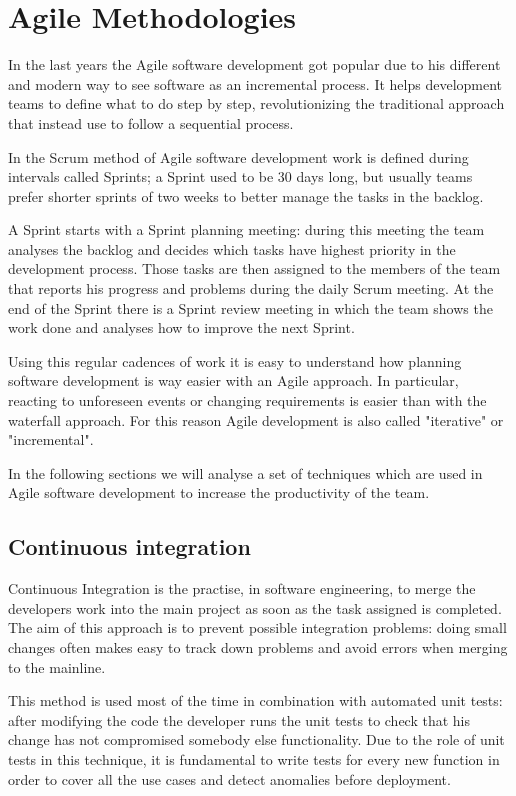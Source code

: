 \section{Agile Methodologies}

In the last years the Agile software development got popular due to his
different and modern way to see software as an incremental process. It
helps development teams to define what to do step by step, revolutionizing
the traditional approach that instead use to follow a sequential process.

In the Scrum method of Agile software development work is defined during
intervals called Sprints; a Sprint used to be 30 days long, but usually
teams prefer shorter sprints of two weeks to better manage the tasks in
the backlog.

A Sprint starts with a Sprint planning meeting: during this meeting the team
analyses the backlog and decides which tasks have highest priority in the
development process. Those tasks are then assigned to the members of the team
that reports his progress and problems during the daily Scrum meeting. At the
end of the Sprint there is a Sprint review meeting in which the team shows the
work done and analyses how to improve the next Sprint.

Using this regular cadences of work it is easy to understand how planning
software development is way easier with an Agile approach. In particular,
reacting to unforeseen events or changing requirements is easier than with
the waterfall approach. For this reason Agile development is also called
"iterative" or "incremental".

In the following sections we will analyse a set of techniques which are
used in Agile software development to increase the productivity of the
team.

\subsection{Continuous integration}

Continuous Integration is the practise, in software engineering, to merge
the developers work into the main project as soon as the task assigned is
completed. The aim of this approach is to prevent possible integration
problems: doing small changes often makes easy to track down problems and
avoid errors when merging to the mainline.

This method is used most of the time in combination with automated unit tests:
after modifying the code the developer runs the unit tests to check that
his change has not compromised somebody else functionality. Due to the
role of unit tests in this technique, it is fundamental to write tests for
every new function in order to cover all the use cases and detect
anomalies before deployment.

